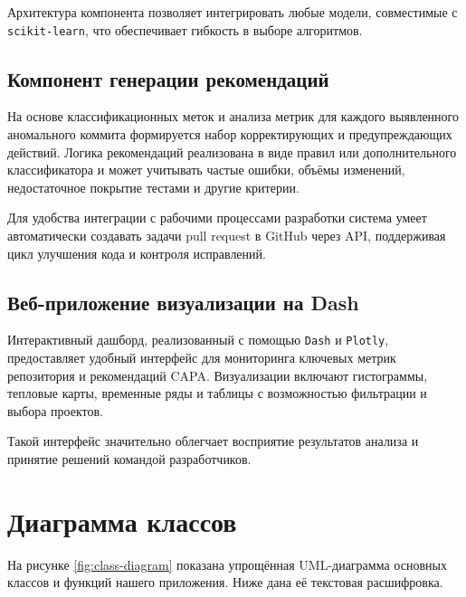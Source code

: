 Архитектура компонента позволяет интегрировать любые модели, совместимые с \texttt{scikit-learn}, что обеспечивает гибкость в выборе алгоритмов.

\subsection{Компонент генерации рекомендаций}

На основе классификационных меток и анализа метрик для каждого выявленного аномального коммита формируется набор корректирующих и предупреждающих действий. Логика рекомендаций реализована в виде правил или дополнительного классификатора и может учитывать частые ошибки, объёмы изменений, недостаточное покрытие тестами и другие критерии.

Для удобства интеграции с рабочими процессами разработки система умеет автоматически создавать задачи pull request в GitHub через API, поддерживая цикл улучшения кода и контроля исправлений.

\subsection{Веб-приложение визуализации на Dash}

Интерактивный дашборд, реализованный с помощью \texttt{Dash} и \texttt{Plotly}, предоставляет удобный интерфейс для мониторинга ключевых метрик репозитория и рекомендаций CAPA. Визуализации включают гистограммы, тепловые карты, временные ряды и таблицы с возможностью фильтрации и выбора проектов.

Такой интерфейс значительно облегчает восприятие результатов анализа и принятие решений командой разработчиков.

\section{Диаграмма классов} \label{ch2:sec5}

На рисунке \ref{fig:class-diagram} показана упрощённая UML-диаграмма основных классов и функций нашего приложения. Ниже дана её текстовая расшифровка.

